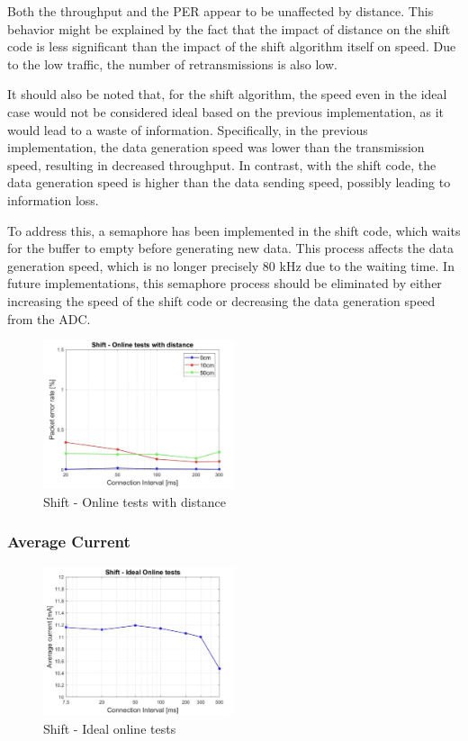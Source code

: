 \documentclass{Configuration_Files/PoliMi3i_thesis}
\begin{document}
Both the throughput and the PER appear to be unaffected by distance. This behavior might be explained by the fact that the impact of distance on the shift code is less significant than the impact of the shift algorithm itself on speed. Due to the low traffic, the number of retransmissions is also low.

It should also be noted that, for the shift algorithm, the speed even in the ideal case would not be considered ideal based on the previous implementation, as it would lead to a waste of information. Specifically, in the previous implementation, the data generation speed was lower than the transmission speed, resulting in decreased throughput. In contrast, with the shift code, the data generation speed is higher than the data sending speed, possibly leading to information loss.

To address this, a semaphore has been implemented in the shift code, which waits for the buffer to empty before generating new data. This process affects the data generation speed, which is no longer precisely 80 kHz due to the waiting time. In future implementations, this semaphore process should be eliminated by either increasing the speed of the shift code or decreasing the data generation speed from the ADC.

\begin{figure}[H]
    \centering
    \includegraphics[width=0.5\textwidth]{Results Manuel/figure18}
    \caption{Shift - Online tests with distance}
    \label{manuel_results_18}
\end{figure}

\subsubsection*{Average Current}

\begin{figure}[H]
    \centering
    \includegraphics[width=0.5\textwidth]{Results Manuel/figure19}
    \caption{Shift - Ideal online tests}
    \label{manuel_results_19}
\end{figure}
\end{document}
